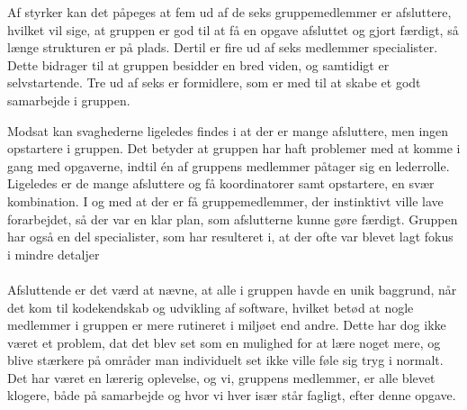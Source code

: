 Af styrker kan det påpeges at fem ud af de seks gruppemedlemmer er afsluttere, hvilket vil sige, at gruppen er god til at få en opgave afsluttet og gjort færdigt, så længe strukturen er på plads. Dertil er fire ud af seks medlemmer specialister. Dette bidrager til at gruppen besidder en bred viden, og samtidigt er selvstartende. Tre ud af seks er formidlere, som er med til at skabe et godt samarbejde i gruppen.

Modsat kan svaghederne ligeledes findes i at der er mange afsluttere, men ingen opstartere i gruppen. Det betyder at gruppen har haft problemer med at komme i gang med opgaverne, indtil én af gruppens medlemmer påtager sig en lederrolle. Ligeledes er de mange afsluttere og få koordinatorer samt opstartere, en svær kombination. I og med at der er få gruppemedlemmer, der instinktivt ville lave forarbejdet, så der var en klar plan, som afslutterne kunne gøre færdigt. Gruppen har også en del specialister, som har resulteret i, at der ofte var blevet lagt fokus i mindre detaljer
\\\\
Afsluttende er det værd at nævne, at alle i gruppen havde en unik baggrund, når det kom til kodekendskab og udvikling af software, hvilket betød at nogle medlemmer i gruppen er mere rutineret i miljøet end andre. Dette har dog ikke været et problem, dat det blev set som en mulighed for at lære noget mere, og blive stærkere på områder man individuelt set ikke ville føle sig tryg i normalt. Det har været en lærerig oplevelse, og vi, gruppens medlemmer, er alle blevet klogere, både på samarbejde og hvor vi hver især står fagligt, efter denne opgave.